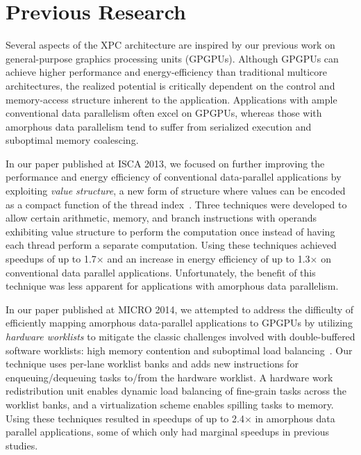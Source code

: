 
\section{Previous Research}
\label{sec-background}

Several aspects of the XPC architecture are inspired by our previous work
on general-purpose graphics processing units (GPGPUs). Although GPGPUs
can achieve higher performance and energy-efficiency than traditional
multicore architectures, the realized potential is critically dependent
on the control and memory-access structure inherent to the application.
Applications with ample conventional data parallelism often excel on
GPGPUs, whereas those with amorphous data parallelism tend to suffer from
serialized execution and suboptimal memory coalescing.

In our paper published at ISCA 2013, we focused on further improving the
performance and energy efficiency of conventional data-parallel
applications by exploiting \emph{value structure}, a new form of
structure where values can be encoded as a compact function of the thread
index~\cite{kim-simt-vstruct-isca2013}. Three techniques were developed
to allow certain arithmetic, memory, and branch instructions with
operands exhibiting value structure to perform the computation once
instead of having each thread perform a separate computation. Using these
techniques achieved speedups of up to 1.7$\times$ and an increase in
energy efficiency of up to 1.3$\times$ on conventional data parallel
applications. Unfortunately, the benefit of this technique was less
apparent for applications with amorphous data parallelism.

In our paper published at MICRO 2014, we attempted to address the
difficulty of efficiently mapping amorphous data-parallel applications to
GPGPUs by utilizing \emph{hardware worklists} to mitigate the classic
challenges involved with double-buffered software worklists: high memory
contention and suboptimal load balancing~\cite{kim-hwwl-micro2014}. Our
technique uses per-lane worklist banks and adds new instructions for
enqueuing/dequeuing tasks to/from the hardware worklist. A hardware work
redistribution unit enables dynamic load balancing of fine-grain tasks
across the worklist banks, and a virtualization scheme enables spilling
tasks to memory. Using these techniques resulted in speedups of up to
2.4$\times$ in amorphous data parallel applications, some of which only
had marginal speedups in previous studies.

